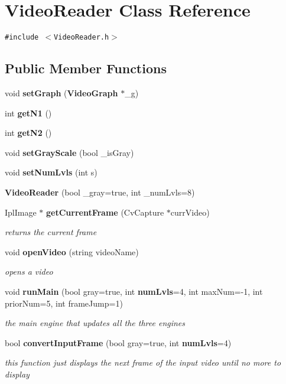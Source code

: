 \section{VideoReader Class Reference}
\label{classVideoReader}
{\tt \#include $<$VideoReader.h$>$}

\subsection*{Public Member Functions}
\begin{CompactItemize}
\item 
void {\bf setGraph} ({\bf VideoGraph} $\ast$\_\-g)
\item 
int {\bf getN1} ()
\item 
int {\bf getN2} ()
\item 
void {\bf setGrayScale} (bool \_\-isGray)
\item 
void {\bf setNumLvls} (int s)
\item 
{\bf VideoReader} (bool \_\-gray=true, int \_\-numLvls=8)
\item 
IplImage $\ast$ {\bf getCurrentFrame} (CvCapture $\ast$currVideo)
\begin{CompactList}\small\item\em returns the current frame \item\end{CompactList}\item 
void {\bf openVideo} (string videoName)
\begin{CompactList}\small\item\em opens a video \item\end{CompactList}\item 
void {\bf runMain} (bool gray=true, int {\bf numLvls}=4, int maxNum=-1, int priorNum=5, int frameJump=1)
\begin{CompactList}\small\item\em the main engine that updates all the three engines \item\end{CompactList}\item 
bool {\bf convertInputFrame} (bool gray=true, int {\bf numLvls}=4)
\begin{CompactList}\small\item\em this function just displays the next frame of the input video until no more to display \item\end{CompactList}\item 

\end{CompactItemize}
